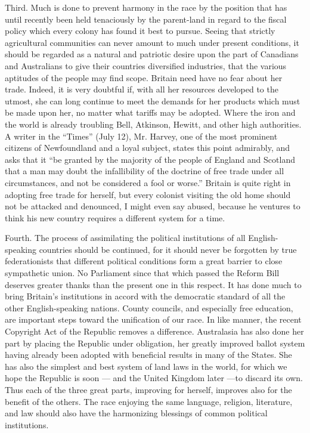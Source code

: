 \documentclass[11pt,openany]{book}
\begin{document}
Third. Much is done to prevent harmony in the race by the position that has until recently been held tenaciously by the parent-land in regard to the fiscal policy which every colony has found it best to pursue. Seeing that strictly agricultural communities can never amount to much under present conditions, it should be regarded as a natural and patriotic desire upon the part of Canadians and Australians to give their countries diversified industries, that the various aptitudes of the people may find scope. Britain need have no fear about her trade. Indeed, it is very doubtful if, with all her resources developed to the utmost, she can long continue to meet the demands for her products which must be made upon her, no matter what tariffs may be adopted. Where the iron and the world is already troubling Bell, Atkinson, Hewitt, and other high authorities. A writer in the ``Times'' (July 12), Mr. Harvey, one of the most prominent citizens of Newfoundland and a loyal subject, states this point admirably, and asks that it ``be granted by the majority of the people of England and Scotland that a man may doubt the infallibility of the doctrine of free trade under all circumstances, and not be considered a fool or worse.'' Britain is quite right in adopting free trade for herself, but every colonist visiting the old home should not be attacked and denounced, I might even say abused, because he ventures to think his new country requires a different system for a time.

Fourth. The process of assimilating the political institutions of all English-speaking countries should be continued, for it should never be forgotten by true federationists that different political conditions form a great barrier to close sympathetic union. No Parliament since that which passed the Reform Bill deserves greater thanks than the present one in this respect. It has done much to bring Britain's institutions in accord with the democratic standard of all the other English-speaking nations. County councils, and especially free education, are important steps toward the unification of our race. In like manner, the recent Copyright Act of the Republic removes a difference. Australasia has also done her part by placing the Republic under obligation, her greatly improved ballot system having already been adopted with beneficial results in many of the States. She has also the simplest and best system of land laws in the world, for which we hope the Republic is soon --- and the United Kingdom later ---to discard its own. Thus each of the three great parts, improving for herself, improves also for the benefit of the others. The race enjoying the same language, religion, literature, and law should also have the harmonizing blessings of common political institutions.
\end{document}
